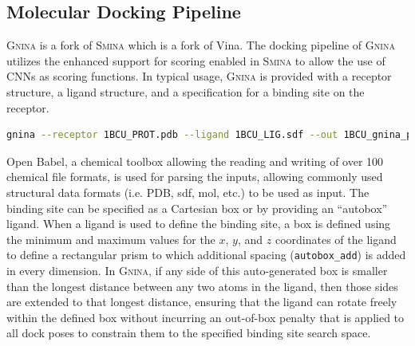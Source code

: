 \documentclass[journal=jcisd8,manuscript=article]{achemso}
\begin{document}
\subsection{Molecular Docking Pipeline}
\textsc{\textsc{Gnina}} is a fork of \textsc{Smina}\cite{koes2013lessons} which is a fork of Vina\cite{trott2010autodock}. The docking pipeline of \textsc{\textsc{Gnina}} utilizes the enhanced support for scoring enabled in \textsc{Smina} to allow the use of CNNs as scoring functions. In typical usage, \textsc{\textsc{Gnina}} is provided with a receptor structure, a ligand structure, and a specification for a binding site on the receptor.
\begin{lstlisting}[title=Gnina Usage,label=code:Usage,language=bash]
    gnina --receptor 1BCU_PROT.pdb --ligand 1BCU_LIG.sdf --out 1BCU_gnina_poses.sdf.gz --autobox_ligand 1BCU_LIG.sdf --autobox_add 4 --cnn Crossdock_Default2018 Dense_3 --cnn_scoring rescore --exhaustiveness 8 --num_mc_saved 50 --cnn_rotation 0 --num_modes 9 --min_rmsd_filter 1
\end{lstlisting}
Open Babel\cite{o2011open,babelopen}, a chemical toolbox allowing the reading and writing of over 100 chemical file formats, is used for parsing the inputs, allowing commonly used structural data formats (i.e. PDB, sdf, mol, etc.) to be used as input. The binding site can be specified as a Cartesian box or by providing an ``autobox'' ligand.  When a ligand is used to define the binding site, a box is defined using the minimum and maximum values for the $x$, $y$, and $z$ coordinates of the ligand to define a rectangular prism to which additional spacing (\texttt{autobox\_add}) is added in every dimension. In \textsc{Gnina}, if any side of this auto-generated box is smaller than the longest distance between any two atoms in the ligand, then those sides are extended to that longest distance, ensuring that the ligand can rotate freely within the defined box without incurring an out-of-box penalty that is applied to all dock poses to constrain them to the specified binding site search space.
\end{document}
